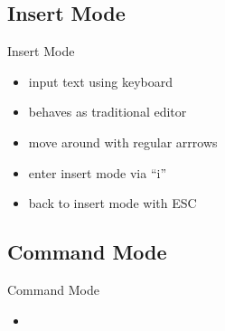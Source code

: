 \documentclass[xcolor=x11names,compress,t]{beamer}
\renewcommand{\(}{\begin{columns}[T]}
\renewcommand{\)}{\end{columns}}
\newcommand{\<}[1]{\begin{column}{#1}}
\renewcommand{\>}{\end{column}}
\newenvironment{slide}[1]{\subsection{#1} \begin{frame}{#1}}{\end{frame}}
\begin{document}
\begin{slide}{Insert Mode}
    \begin{itemize}
        \item input text using keyboard
        \item behaves as traditional editor
        \item move around with regular arrrows
        \item enter insert mode via ``i''
        \item back to insert mode with ESC
    \end{itemize}
\end{slide}

\begin{slide}{Command Mode}
    \begin{itemize}
        \item 
    \end{itemize}
\end{slide}
\end{document}

